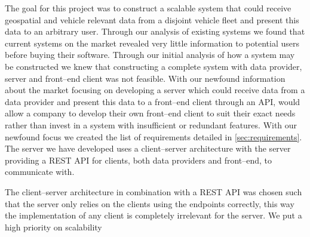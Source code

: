 The goal for this project was to construct a scalable system that could receive geospatial and vehicle relevant data from a disjoint vehicle fleet and present this data to an arbitrary user.
Through our analysis of existing systems we found that current systems on the market revealed very little information to potential users before buying their software.
Through our initial analysis of how a system may be constructed we knew that constructing a complete system with data provider, server and front--end client was not feasible.
With our newfound information about the market focusing on developing a server which could receive data from a data provider and present this data to a front--end client through an API, would allow a company to develop their own front--end client to suit their exact needs rather than invest in a system with insufficient or redundant features.
With our newfound focus we created the list of requirements detailed in \cref{sec:requirements}.
The server we have developed uses a client--server architecture with the server providing a REST API for clients, both data providers and front--end, to communicate with.

\bigskip
The client--server architecture in combination with a REST API was chosen such that the server only relies on the clients using the endpoints correctly, this way the implementation of any client is completely irrelevant for the server.
We put a high priority on scalability 

